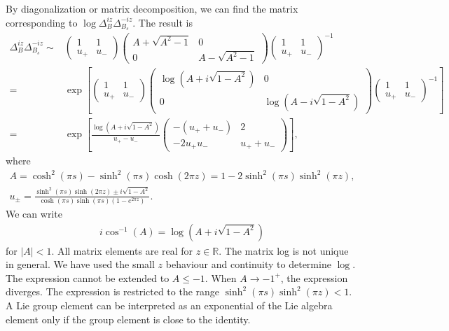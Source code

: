 \documentclass[a4paper,11pt]{article}
\theoremstyle{definition}
\begin{document}
By diagonalization or matrix decomposition, we can find the matrix corresponding to $\log \Delta_{B}^{iz}\Delta_{B_s}^{-iz}$. The result is
\begin{align}
    \Delta_{B}^{iz}\Delta_{B_s}^{-iz}  \sim& \begin{pmatrix} 1 &1 \\u_+ & u_-\end{pmatrix}\begin{pmatrix} A+\sqrt{A^2-1} &0 \\0 & A-\sqrt{A^2-1}\end{pmatrix}\begin{pmatrix} 1 &1 \\u_+ & u_-\end{pmatrix}^{-1}\\
    =& \exp\left[\begin{pmatrix} 1 &1 \\u_+ & u_-\end{pmatrix}\begin{pmatrix} \log(A+i\sqrt{1-A^2}) &0 \\0 & \log(A-i\sqrt{1-A^2})\end{pmatrix}\begin{pmatrix} 1 &1 \\u_+ & u_-\end{pmatrix}^{-1} \right]\\
    =& \exp\left[\frac{{\log(A+i\sqrt{1-A^2})}}{u
    _+-u_-} \begin{pmatrix} -(u_+ + u_-) & 2 \\ -2u_+u_- & u_++u_-\end{pmatrix} \right],
\end{align}
where
\begin{gather}
    A = \cosh^2 (\pi s) - \sinh^2 (\pi s) \cosh(2\pi z) = 1-2\sinh^2(\pi s)\sinh^2(\pi z),\\
    u_\pm = \frac{\sinh^2(\pi s)\sinh(2\pi z)  \pm i\sqrt{1-A^2}}{\cosh(\pi s) \sinh(\pi s) (1-e^{2\pi z})}.
\end{gather}
We can write
\begin{eqnarray}
    i\cos^{-1}(A) = \log(A+i\sqrt{1-A^2})
\end{eqnarray}
for $|A| < 1$. All matrix elements are real for $z\in\mathbb{R}$. The matrix log is not unique in general. We have used the small $z$ behaviour and continuity to determine $\log$. The expression cannot be extended to $A\leq -1$. When $A\to-1^+$, the expression diverges. The expression is restricted to the range $\sinh^2(\pi s)\sinh^2(\pi z)< 1$. A Lie group element can be interpreted as an exponential of the Lie algebra element only if the group element is close to the identity. 
\end{document}
